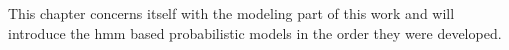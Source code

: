 \documentclass[../ms.tex]{subfiles}
\begin{document}
This chapter concerns itself with the modeling part of this work and will introduce the \gls{hmm} based probabilistic models in the order they were developed.
\end{document}
